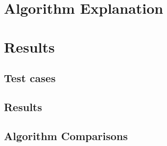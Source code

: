 \documentclass[12pt, a4paper]{article}
\begin{document}
\section{Algorithm Explanation}





\section{Results}
\subsection{Test cases}
\subsection{Results}
\subsection{Algorithm Comparisons}
\end{document}
